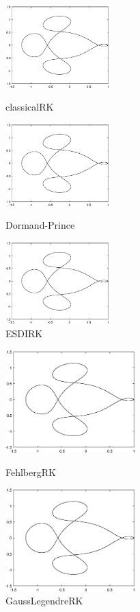 \documentclass[12]{article}%
\begin{document}
\begin{figure}[H]
    \centering
    \begin{minipage}[t]{0.3\textwidth}
    \centering
    \includegraphics[width=4cm]{../pic/RK1.eps}
    \caption{classicalRK}
    \end{minipage}
    \begin{minipage}[t]{0.3\textwidth}
    \centering
    \includegraphics[width=4cm]{../pic/DormandPrinceRK1.eps}
    \caption{Dormand-Prince}
    \end{minipage}
    \begin{minipage}[t]{0.3\textwidth}
    \centering
    \includegraphics[width=4cm]{../pic/ESDIRK1.eps}
    \caption{ESDIRK}
    \end{minipage}
\end{figure}
\begin{figure}[H]
    \centering
    \begin{minipage}[t]{0.48\textwidth}
    \centering
    \includegraphics[width=5cm]{../pic/FehlbergRK1.eps}
    \caption{FehlbergRK}
    \end{minipage}
    \begin{minipage}[t]{0.48\textwidth}
    \centering
    \includegraphics[width=5cm]{../pic/GaussLegendreRK1.eps}
    \caption{GaussLegendreRK}
    \end{minipage}
\end{figure}
\end{document}
